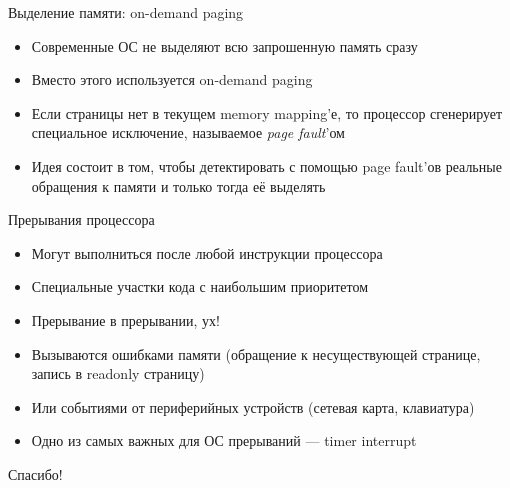 \documentclass[10pt,pdf,hyperref={unicode}]{beamer}
\begin{document}
\begin{frame}{Выделение памяти: on-demand paging}
\begin{itemize}
    \item Современные ОС не выделяют всю запрошенную память сразу
    \item Вместо этого используется on-demand paging
    \item Если страницы нет в текущем memory mapping'е, то процессор сгенерирует специальное исключение, называемое \emph{page fault}'ом
    \item Идея состоит в том, чтобы детектировать с помощью page fault'ов реальные обращения к памяти и только тогда её выделять
\end{itemize}
\end{frame}

\begin{frame}{Прерывания процессора}
\begin{itemize}
    \item Могут выполниться после любой инструкции процессора
    \item Специальные участки кода с наибольшим приоритетом
    \item Прерывание в прерывании, ух!
    \item Вызываются ошибками памяти (обращение к несуществующей странице, запись в readonly страницу)
    \item Или событиями от периферийных устройств (сетевая карта, клавиатура)
    \item Одно из самых важных для ОС прерываний — timer interrupt
\end{itemize}
\end{frame}


\begin{frame}
\center\Huge{Спасибо!}
\end{frame}
\end{document}
